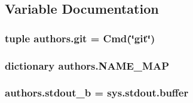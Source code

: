 \subsection{Variable Documentation}
\hypertarget{namespaceauthors_a7ead32abace0583a851e4f7d3b0d2d71}{}
\subsubsection[{git}]{\setlength{\rightskip}{0pt plus 5cm}tuple authors.\+git = {\bf Cmd}(\char`\"{}git\char`\"{})}\label{namespaceauthors_a7ead32abace0583a851e4f7d3b0d2d71}
\hypertarget{namespaceauthors_ab7208e1980670083e780a1689a7e63aa}{}
\subsubsection[{N\+A\+M\+E\+\_\+\+M\+A\+P}]{\setlength{\rightskip}{0pt plus 5cm}dictionary authors.\+N\+A\+M\+E\+\_\+\+M\+A\+P}\label{namespaceauthors_ab7208e1980670083e780a1689a7e63aa}
\hypertarget{namespaceauthors_a0bf0fd03fbb45210f1761f27bcc5906e}{}
\subsubsection[{stdout\+\_\+b}]{\setlength{\rightskip}{0pt plus 5cm}authors.\+stdout\+\_\+b = sys.\+stdout.\+buffer}\label{namespaceauthors_a0bf0fd03fbb45210f1761f27bcc5906e}
